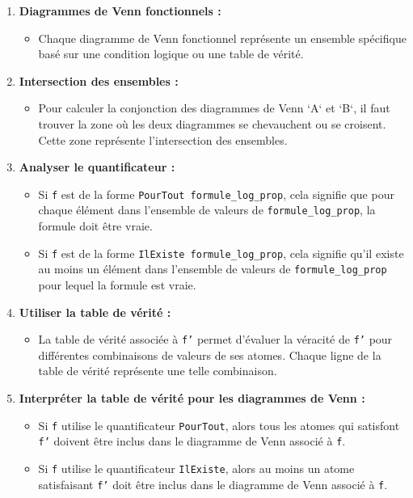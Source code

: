 \documentclass{article}
\begin{document}
\begin{enumerate}
    \item \textbf{Diagrammes de Venn fonctionnels :}
    \begin{itemize}
        \item Chaque diagramme de Venn fonctionnel représente un ensemble spécifique basé sur une condition logique ou une table de vérité.
    \end{itemize}

    \item \textbf{Intersection des ensembles :}
    \begin{itemize}
        \item Pour calculer la conjonction des diagrammes de Venn `A` et `B`, il faut trouver la zone où les deux diagrammes se chevauchent ou se croisent. Cette zone représente l'intersection des ensembles.
    \end{itemize}
    \item \textbf{Analyser le quantificateur :}
    \begin{itemize}
        \item Si \texttt{f} est de la forme \texttt{PourTout formule\_log\_prop}, cela signifie que pour chaque élément dans l'ensemble de valeurs de \texttt{formule\_log\_prop}, la formule doit être vraie.
        \item Si \texttt{f} est de la forme \texttt{IlExiste formule\_log\_prop}, cela signifie qu'il existe au moins un élément dans l'ensemble de valeurs de \texttt{formule\_log\_prop} pour lequel la formule est vraie.
    \end{itemize}
    \item \textbf{Utiliser la table de vérité :}
    \begin{itemize}
        \item La table de vérité associée à \texttt{f'} permet d'évaluer la véracité de \texttt{f'} pour différentes combinaisons de valeurs de ses atomes. Chaque ligne de la table de vérité représente une telle combinaison.
    \end{itemize}

    \item \textbf{Interpréter la table de vérité pour les diagrammes de Venn :}
    \begin{itemize}
        \item Si \texttt{f} utilise le quantificateur \texttt{PourTout}, alors tous les atomes qui satisfont \texttt{f'} doivent être inclus dans le diagramme de Venn associé à \texttt{f}.
        \item Si \texttt{f} utilise le quantificateur \texttt{IlExiste}, alors au moins un atome satisfaisant \texttt{f'} doit être inclus dans le diagramme de Venn associé à \texttt{f}.
    \end{itemize}


\end{enumerate}
\end{document}
